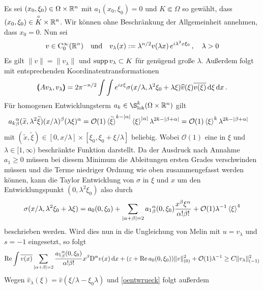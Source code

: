 Es sei $(x_0,\xi_0)\in\Omega\times\mathbb R^n$ mit $a_1(x_0,\xi_0)=0$ und $K\Subset \Omega$ so gewählt, dass  $(x_0,\xi_0)\in \overset{\circ} {K}\times\mathbb R^n$. Wir können ohne Beschränkung der Allgemeinheit annehmen, dass $x_0=0$. 
Nun sei 
\begin{align*}
 v\in\mathrm C^\infty_0(\mathbb R^n) \quad \text{und} \quad v_\lambda(x):=\lambda^{n/2}v(\lambda x)\, e^{i\lambda^2x\xi_0}\, ,\quad\lambda>0
\end{align*}
Es gilt $\|v\|=\|v_\lambda\|$ und $\operatorname{supp} v_\lambda \subset K$ für genügend große $\lambda$. Außerdem folgt mit entsprechenden Koordinatentransformationen
\begin{align*}
\pmb(A v_\lambda,v_\lambda\pmb) = {2\pi}^{-n/2}\int\int e^{ix\xi} \sigma(x/\lambda,\lambda^2\xi_0 + \lambda\xi)\widehat v(\xi)\overline{v(\xi)}\,\mathrm d\xi\,\mathrm d x\,.
\end{align*}
Für homogenen Entwicklungsterm $a_k\in\S^k_\mathrm{lok}(\Omega\times\R^n)$ gilt
\begin{align*}
&{a_k}^\alpha_\beta(\widetilde x, \lambda^2 \widetilde \xi)(x/\lambda)^\beta(\lambda\xi)^\alpha = \mathcal O(1)\braket{\widetilde\xi}^{k-\lvert\alpha\rvert}\braket{\xi}^{\lvert\alpha\rvert}\lambda^{2k-\lvert\beta+\alpha\rvert} = \mathcal O(1)\braket{\xi}^{k}\lambda^{2k-\lvert\beta+\alpha\rvert}
\end{align*}
mit $(\widetilde x,\widetilde\xi)\in[0,x/\lambda]\times[\xi_0,\xi_0 + \xi/\lambda]$ beliebig. Wobei $\mathcal O(1)$ eine in $\xi$ und $\lambda\in[1,\infty)$ beschränkte Funktion darstellt. Da der Ausdruck nach Annahme $a_1\ge 0$ müssen bei diesem Minimum die Ableitungen ersten Grades verschwinden müssen und die Terme niedriger Ordnung wie oben zusammengefasst werden können, kann die Taylor Entwicklung von $\sigma$ in $\xi$ und $x$ um den Entwicklungspunkt $(0,\lambda^2\xi_0)$ also durch
\begin{align*}
\sigma(x/\lambda, \lambda^2\xi_0+\lambda\xi) = a_0(0,\xi_0) + \sum_{\lvert\alpha+\beta\rvert=2} {a_1}^\alpha_\beta(0,\xi_0)\frac{x^\beta\xi^\alpha}{\alpha!\beta!} + \mathcal O(1) \lambda^{-1}\braket{\xi}^4
\end{align*}
beschrieben werden. Wird dies nun in die Ungleichung von Melin mit $u=v_\lambda$ und $s=-1$ eingesetzt, so folgt
\begin{align*}
\operatorname{Re}\int \overline{v(x)}\sum_{\lvert\alpha+\beta\rvert=2}\frac{{a_1}^\alpha_\beta(0,\xi_0)}{\alpha!\beta!}x^\beta\mathrm D^\alpha v(x)\,\mathrm d x + (\varepsilon +\operatorname{Re} a_0(0,\xi_0))\|v\|_{(0)}^2 + \mathcal O(1)\lambda^{-1}\ge C\|v_\lambda\|_{(-1)}^2
\end{align*}
Wegen $\widehat{v}_\lambda(\xi)=\widehat{v}(\xi/\lambda-\xi_0\lambda)$ und \eqref{oentwrueck} folgt außerdem
